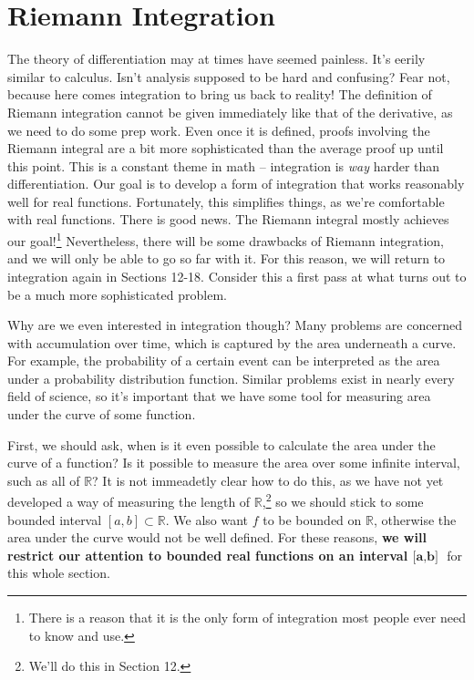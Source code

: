 \documentclass{article}
\newcommand{\R}{\mathbb{R}}
\theoremstyle{definition}
\begin{document}
	\section{Riemann Integration}
	The theory of differentiation may at times have seemed painless. It's eerily similar to calculus. Isn't analysis supposed to be hard and confusing? Fear not, because here comes integration to bring us back to reality! The definition of Riemann integration cannot be given immediately like that of the derivative, as we need to do some prep work. Even once it is defined, proofs involving the Riemann integral are a bit more sophisticated than the average proof up until this point. This is a constant theme in math -- integration is \textit{way} harder than differentiation. Our goal is to develop a form of integration that works reasonably well for real functions. Fortunately, this simplifies things, as we're comfortable with real functions. There is good news. The Riemann integral mostly achieves our goal!\footnote{There is a reason that it is the only form of integration most people ever need to know and use.} Nevertheless, there will be some drawbacks of Riemann integration, and we will only be able to go so far with it. For this reason, we will return to integration again in Sections 12-18. Consider this a first pass at what turns out to be a much more sophisticated problem. 
	
	Why are we even interested in integration though? Many problems are concerned with accumulation over time, which is captured by the area underneath a curve. For example, the probability of a certain event can be interpreted as the area under a probability distribution function. Similar problems exist in nearly every field of science, so it's important that we have some tool for measuring area under the curve of some function. 
	
	First, we should ask, when is it even possible to calculate the area under the curve of a function? Is it possible to measure the area over some infinite interval, such as all of $ \R $? It is not immeadetly clear how to do this, as we have not yet developed a way of measuring the length of $ \R $,\footnote{We'll do this in Section 12.} so we should stick to some bounded interval $ [a,b]\subset\R $. We also want $ f $ to be bounded on $ \R $, otherwise the area under the curve would not be well defined. For these reasons, \textbf{we will restrict our attention to bounded real functions on an interval $ \textbf{[a,b] }$} for this whole section. 
\end{document}

